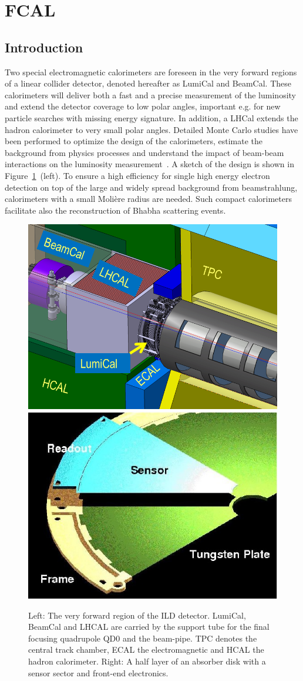 \section{FCAL}
\subsection{Introduction}
Two special electromagnetic calorimeters are foreseen in the very forward regions of a linear collider detector, denoted hereafter as
LumiCal and BeamCal.
These calorimeters will deliver both a fast and a precise measurement of the luminosity
and extend the detector coverage to low polar angles,
important e.g. for new particle searches with missing energy signature.
In addition, a LHCal extends the hadron calorimeter to very small polar angles.
Detailed Monte Carlo studies have been performed to
optimize the design of the calorimeters, estimate the background from physics processes and understand the impact
of beam-beam interactions on the luminosity measurement~\cite{2010JInst...512002A}.
A sketch of the design is shown in Figure~\ref{fig:Forward_structure}~(left).
To ensure a high efficiency for single high energy electron detection on top of the large and widely spread
background from beamstrahlung, calorimeters with a small Moli\`{e}re radius are needed. Such compact calorimeters facilitate
also the reconstruction of Bhabha scattering events.
\begin{figure}[hbp]
  \centering
   \includegraphics[width=0.45\columnwidth]{Calorimeter/FCAL/figs/forward_region_new} \hfill
   \includegraphics[width=0.45\columnwidth]{Calorimeter/FCAL/figs/BClayer}
  \caption{Left: The very forward region of the ILD detector.
  LumiCal, BeamCal and LHCAL are carried by
  the support tube for the final focusing quadrupole QD0 and the beam-pipe.
  TPC denotes the central track chamber, ECAL the electromagnetic and
  HCAL the hadron calorimeter.
  Right: A half layer of an absorber disk with a sensor sector and front-end electronics.}
  \label{fig:Forward_structure}
\end{figure}
